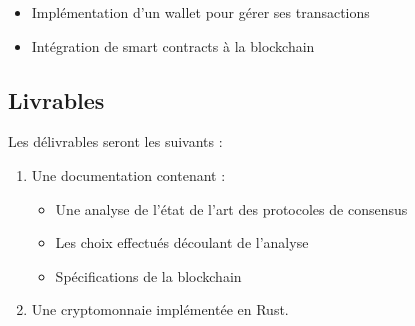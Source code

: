 \begin{itemize}
    \item Implémentation d'un wallet pour gérer ses transactions
    \item Intégration de smart contracts à la blockchain
\end{itemize}

\subsection*{Livrables}
Les délivrables seront les suivants :
\begin{enumerate}
    \item Une documentation contenant :
    	\begin{itemize}
        	\item Une analyse de l'état de l'art des protocoles de consensus
        	\item Les choix effectués découlant de l'analyse
        	\item Spécifications de la blockchain
    	\end{itemize}
    \item Une cryptomonnaie implémentée en Rust.
\end{enumerate}
